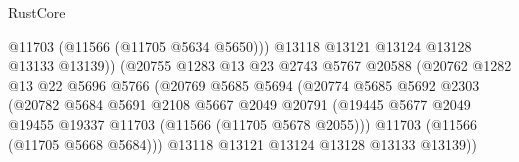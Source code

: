 \begin{lexlean}{RustCore}
\begin{coremodule}
                                            @11703
                                            (@11566 (@11705 @5634 @5650)))
                                          @13118
                                          @13121
                                          @13124
                                          @13128
                                          @13133
                                          @13139))
                                      (@20755
                                        @1283
                                        @13
                                        @23
                                        @2743
                                        @5767
                                        @20588
                                        (@20762
                                          @1282
                                          @13
                                          @22
                                          @5696
                                          @5766
                                          (@20769
                                            @5685
                                            @5694
                                            (@20774
                                              @5685
                                              @5692
                                              @2303
                                              (@20782
                                                @5684
                                                @5691
                                                @2108
                                                @5667
                                                @2049
                                                @20791
                                                (@19445
                                                  @5677
                                                  @2049
                                                  @19455
                                                  @19337
                                                  @11703
                                                  (@11566 (@11705 @5678 @2055)))
                                                @11703
                                                (@11566 (@11705 @5668 @5684)))
                                              @13118
                                              @13121
                                              @13124
                                              @13128
                                              @13133
                                              @13139))

\end{coremodule}
\end{lexlean}
